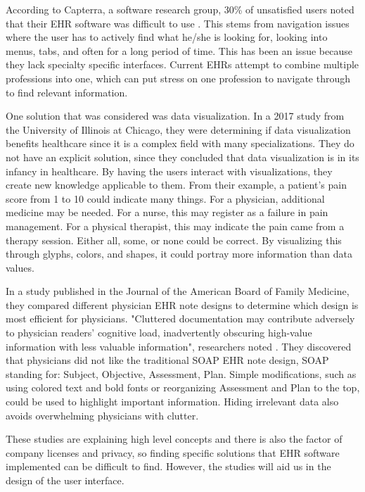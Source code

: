 According to Capterra, a software research group,  30\% of unsatisfied users noted that their EHR software was difficult to use \cite{Reisenwitz2015}. This stems from navigation issues where the user has to actively find what he/she is looking for, looking into menus, tabs, and often for a long period of time. This has been an issue because they lack specialty specific interfaces. Current EHRs attempt to combine multiple professions into one, which can put stress on one profession to navigate through to find relevant information. \cite{Monica2018}

One solution that was considered was data visualization. In a 2017 study from the University of Illinois at Chicago, they were determining if data visualization benefits healthcare since it is a complex field with many specializations. They do not have an explicit solution, since they concluded that data visualization is in its infancy in healthcare. By having the users interact with visualizations, they create new knowledge applicable to them. From their example, a patient's pain score from 1 to 10 could indicate many things. For a physician, additional medicine may be needed. For a nurse, this may register as a failure in pain management. For a physical therapist, this may indicate the pain came from a therapy session. Either all, some, or none could be correct. By visualizing this through glyphs, colors, and shapes, it could portray more information than data values.
\cite{Boyd2017}

In a study published in the Journal of the American Board of Family Medicine, they compared different physician EHR note designs to determine which design is most efficient for physicians. "Cluttered documentation may contribute adversely to physician readers’ cognitive load, inadvertently obscuring high-value information with less valuable information", researchers noted \cite{Monica2017}. They discovered that physicians did not like the traditional SOAP EHR note design, SOAP standing for: Subject, Objective, Assessment, Plan. Simple modifications, such as using colored text and bold fonts or reorganizing Assessment and Plan to the top, could be used to highlight important information. Hiding irrelevant data also avoids overwhelming physicians with clutter.
 \cite{Belden2017}
 
 These studies are explaining high level concepts and there is also the factor of company licenses and privacy, so finding specific solutions that EHR software implemented can be difficult to find. However, the studies will aid us in the design of the user interface.